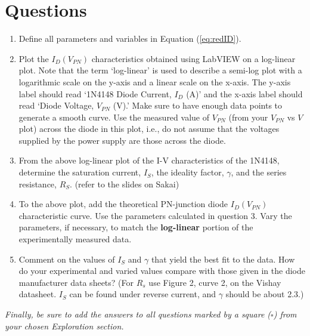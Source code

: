 \documentclass[12pt]{../manual}
\begin{document}
\newpage
\section{Questions}
\begin{enumerate}
\item Define all parameters and variables in Equation (\ref{eq:redID}).
\item Plot the $I_D(V_{PN})$ characteristics obtained using LabVIEW on a log-linear plot. Note that the term `log-linear' is used to describe a semi-log plot with a logarithmic scale on the y-axis and a linear scale on the x-axis. The y-axis label should read `1N4148 Diode Current, $I_D$ (A)' and the x-axis label should read `Diode Voltage, $V_{PN}$ (V).' Make sure to have enough data points to generate a smooth curve. Use the measured value of $V_{PN}$ (from your $V_{PN}$ vs $V$ plot) across the diode in this plot, i.e., do not assume that the voltages supplied by the power supply are those across the diode.
\item From the above log-linear plot of the I-V characteristics of the 1N4148, determine the saturation current, $I_S$, the ideality factor, $\gamma$, and the series resistance, $R_S$. (refer to the slides on Sakai)
\item To the above plot, add the theoretical PN-junction diode $I_D(V_{PN})$ characteristic curve. Use the parameters calculated in question 3. Vary the parameters, if necessary, to match the \textbf{log-linear} portion of the experimentally measured data.
\item Comment on the values of $I_S$ and $\gamma$ that yield the best fit to the data. How do your experimental and varied values compare with those given in the diode manufacturer data sheets? (For $R_s$ use Figure 2, curve 2, on the Vishay datasheet. $I_S$ can be found under reverse current, and $\gamma$ should be about 2.3.)
\end{enumerate}
\textit{Finally, be sure to add the answers to all questions marked by a square ($\square$) from your chosen Exploration section.}
\end{document}
